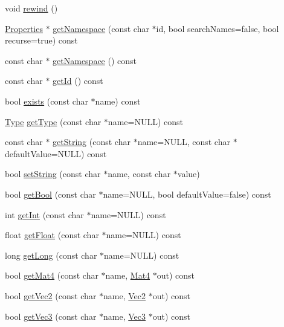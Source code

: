 \begin{DoxyCompactItemize}
void \hyperlink{classProperties_a5a6eab78915d41d3be2f5b65ee03539d}{rewind} ()
\item 
\hyperlink{classProperties}{Properties} $\ast$ \hyperlink{classProperties_ac9bec07cd39f1345076967bad9e87b14}{get\+Namespace} (const char $\ast$id, bool search\+Names=false, bool recurse=true) const
\item 
const char $\ast$ \hyperlink{classProperties_a6bf448bb7a53660f3227cda242d30f24}{get\+Namespace} () const
\item 
const char $\ast$ \hyperlink{classProperties_a96950ddf7fbe91c9e061a2e9f89ec42b}{get\+Id} () const
\item 
bool \hyperlink{classProperties_a4afbc191b79c5994705e85af94045f6a}{exists} (const char $\ast$name) const
\item 
\hyperlink{classProperties_a2d14cc7f8d9f987905632969cc4070e9}{Type} \hyperlink{classProperties_ab8fd2fa0856600cb5c3894a6a2d2b3bc}{get\+Type} (const char $\ast$name=N\+U\+LL) const
\item 
const char $\ast$ \hyperlink{classProperties_a33e7fe8393290a0165a7ddb77ead10ea}{get\+String} (const char $\ast$name=N\+U\+LL, const char $\ast$default\+Value=N\+U\+LL) const
\item 
bool \hyperlink{classProperties_a12c91d3c681f9ace304ac5e48e804cad}{set\+String} (const char $\ast$name, const char $\ast$value)
\item 
bool \hyperlink{classProperties_a71277d94b2486dd4f6f8ca5bde7cfcc8}{get\+Bool} (const char $\ast$name=N\+U\+LL, bool default\+Value=false) const
\item 
int \hyperlink{classProperties_abbea452c3b133805fa955a6e1f91d1db}{get\+Int} (const char $\ast$name=N\+U\+LL) const
\item 
float \hyperlink{classProperties_a4ed868ff9fe81bee289e2e9f5670dbc1}{get\+Float} (const char $\ast$name=N\+U\+LL) const
\item 
long \hyperlink{classProperties_af288a30f0ad39ebf37a8415f0716ddd7}{get\+Long} (const char $\ast$name=N\+U\+LL) const
\item 
bool \hyperlink{classProperties_adf89d5ec337d5cd247b79b6083c820d8}{get\+Mat4} (const char $\ast$name, \hyperlink{classMat4}{Mat4} $\ast$out) const
\item 
bool \hyperlink{classProperties_ad1eacd687cc1f90c31dba67e071aac62}{get\+Vec2} (const char $\ast$name, \hyperlink{classVec2}{Vec2} $\ast$out) const
\item 
bool \hyperlink{classProperties_a5ea69d8939c4f73a4f271c5ebc1ff718}{get\+Vec3} (const char $\ast$name, \hyperlink{classVec3}{Vec3} $\ast$out) const

\end{DoxyCompactItemize}
